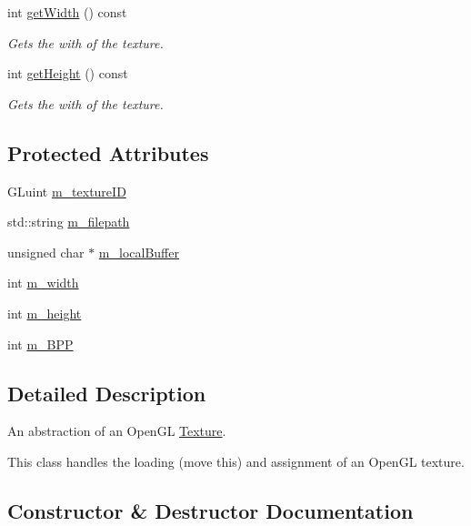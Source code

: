 \begin{DoxyCompactItemize}
int \hyperlink{class_cookie_eng_1_1_resources_1_1_texture_a8f7b83fbbd885d0380100975fe9f5831}{get\+Width} () const
\begin{DoxyCompactList}\small\item\em Gets the with of the texture. \end{DoxyCompactList}\item 
int \hyperlink{class_cookie_eng_1_1_resources_1_1_texture_ac030b164a876de42ad141e9aab422a1c}{get\+Height} () const
\begin{DoxyCompactList}\small\item\em Gets the with of the texture. \end{DoxyCompactList}\end{DoxyCompactItemize}
\subsection*{Protected Attributes}
\begin{DoxyCompactItemize}
\item 
G\+Luint \hyperlink{class_cookie_eng_1_1_resources_1_1_texture_af0b6161b941846749407ba504e68ef5a}{m\+\_\+texture\+ID}
\item 
std\+::string \hyperlink{class_cookie_eng_1_1_resources_1_1_texture_ae67553523fd6d4c29ec23ef180d18bd8}{m\+\_\+filepath}
\item 
unsigned char $\ast$ \hyperlink{class_cookie_eng_1_1_resources_1_1_texture_ab52f89f4a8a5dc91e2581e53857036bf}{m\+\_\+local\+Buffer}
\item 
int \hyperlink{class_cookie_eng_1_1_resources_1_1_texture_ab7a7ce9f87006faa0e921084b0885ce8}{m\+\_\+width}
\item 
int \hyperlink{class_cookie_eng_1_1_resources_1_1_texture_a27412b3f96850a2fa4aabde00741cac5}{m\+\_\+height}
\item 
int \hyperlink{class_cookie_eng_1_1_resources_1_1_texture_ac873fd6475f9059603f79e389089ad48}{m\+\_\+\+B\+PP}
\end{DoxyCompactItemize}


\subsection{Detailed Description}
An abstraction of an Open\+GL \hyperlink{class_cookie_eng_1_1_resources_1_1_texture}{Texture}. 

This class handles the loading (move this) and assignment of an Open\+GL texture. 

\subsection{Constructor \& Destructor Documentation}
\mbox{\label{class_cookie_eng_1_1_resources_1_1_texture_ae7d09944ac0d60a971de919b2fd7108d}} 
